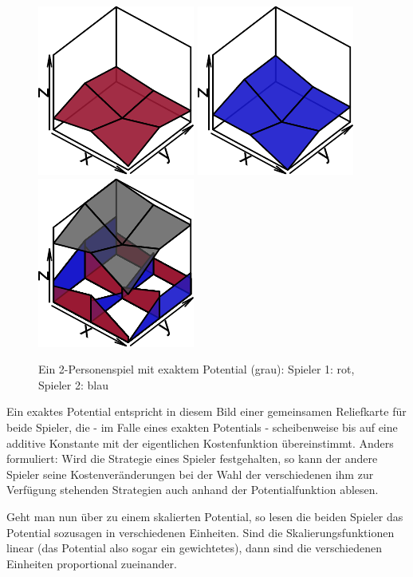 \begin{figure}[h]\centering
	\includegraphics[width=.3\textwidth]{../Bilder/exaktesPotentialSp1.pdf}
	\includegraphics[width=.3\textwidth]{../Bilder/exaktesPotentialSp2.pdf}
	\includegraphics[width=.3\textwidth]{../Bilder/exaktesPotential.pdf}
	\caption{Ein 2-Personenspiel mit exaktem Potential (grau): Spieler 1: rot, Spieler 2: blau}
\end{figure}

Ein exaktes Potential entspricht in diesem Bild einer gemeinsamen Reliefkarte für beide Spieler, die - im Falle eines exakten Potentials - \glqq scheibenweise\grqq{} bis auf eine additive Konstante mit der eigentlichen Kostenfunktion übereinstimmt. Anders formuliert: Wird die Strategie eines Spieler festgehalten, so kann der andere Spieler seine Kostenveränderungen bei der Wahl der verschiedenen ihm zur Verfügung stehenden Strategien auch anhand der Potentialfunktion ablesen. 

Geht man nun über zu einem skalierten Potential, so lesen die beiden Spieler das Potential sozusagen in verschiedenen Einheiten. Sind die Skalierungsfunktionen linear (das Potential also sogar ein gewichtetes), dann sind die verschiedenen Einheiten proportional zueinander. 


